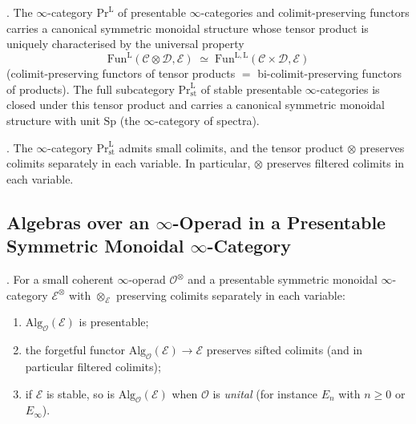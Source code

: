 \begin{theorem}[HA~4.8.1.15, HA~4.8.2.10]
\label{v4-arith:tate:thm:prl-symmetric-monoidal}
\ClaimStatusProvedElsewhere. The \(\infty\)-category
\(\mathrm{Pr}^{\mathrm{L}}\) of presentable \(\infty\)-categories and
colimit-preserving functors carries a canonical symmetric monoidal
structure whose tensor product is uniquely characterised by the
universal property
\[
\mathrm{Fun}^{\mathrm{L}}(\mathcal{C}\otimes\mathcal{D},\mathcal{E})
\;\simeq\;
\mathrm{Fun}^{\mathrm{L},\mathrm{L}}(\mathcal{C}\times\mathcal{D},\mathcal{E})
\]
(colimit-preserving functors of tensor products \(=\)
bi-colimit-preserving functors of products). The full subcategory
\(\mathrm{Pr}^{\mathrm{L}}_{\mathrm{st}}\) of stable presentable
\(\infty\)-categories is closed under this tensor product and carries
a canonical symmetric monoidal structure with unit \(\mathrm{Sp}\) (the
\(\infty\)-category of spectra).
\end{theorem}

\begin{corollary}[HA~4.8.1.18]
\label{v4-arith:tate:cor:prl-admits-colimits}
\ClaimStatusProvedElsewhere. The \(\infty\)-category
\(\mathrm{Pr}^{\mathrm{L}}_{\mathrm{st}}\) admits small colimits, and
the tensor product \(\otimes\) preserves colimits separately in each
variable. In particular, \(\otimes\) preserves filtered colimits in
each variable.
\end{corollary}

\subsection{Algebras over an \(\infty\)-Operad in a Presentable Symmetric Monoidal \(\infty\)-Category}
\label{v4-arith:tate:prelim-alg}

\begin{theorem}[HA~3.2.3.5, HA~3.2.4.4]
\label{v4-arith:tate:thm:alg-O-presentable}
\ClaimStatusProvedElsewhere. For a small coherent \(\infty\)-operad
\(\mathcal{O}^{\otimes}\) and a presentable symmetric monoidal
\(\infty\)-category \(\mathcal{E}^{\otimes}\) with
\(\otimes_{\mathcal{E}}\) preserving colimits separately in each
variable:
\begin{enumerate}
\item \(\mathrm{Alg}_{\mathcal{O}}(\mathcal{E})\) is presentable;
\item the forgetful functor
\(\mathrm{Alg}_{\mathcal{O}}(\mathcal{E})\to\mathcal{E}\) preserves
sifted colimits (and in particular filtered colimits);
\item if \(\mathcal{E}\) is stable, so is
\(\mathrm{Alg}_{\mathcal{O}}(\mathcal{E})\) when \(\mathcal{O}\) is
\emph{unital} (for instance \(E_{n}\) with \(n\geq 0\) or \(E_{\infty}\)).
\end{enumerate}
\end{theorem}

